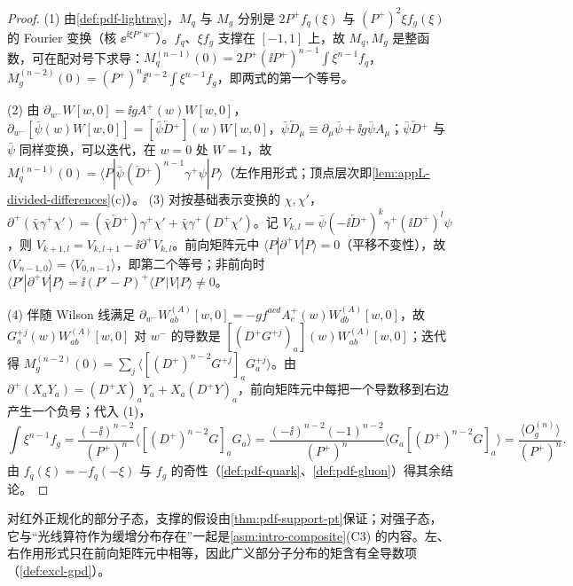 \begin{proof}
(1) 由\cref{def:pdf-lightray}，$M_q$ 与 $M_g$ 分别是 $2P^+f_q(\xi)$ 与 $(P^+)^2\xi f_g(\xi)$ 的 Fourier 变换（核 $\ee^{\ii\xi P^+w^-}$）。$f_q$、$\xi f_g$ 支撑在 $[-1,1]$ 上，故 $M_q,M_g$ 是整函数\cite[定理~7.3.1]{Hormander2003}，可在配对号下求导：$M_q^{(n-1)}(0)=2P^+(\ii P^+)^{n-1}\int\xi^{n-1}f_q$，$M_g^{(n-2)}(0)=(P^+)^n\ii^{n-2}\int\xi^{n-1}f_g$，即两式的第一个等号。

(2) 由 $\partial_{w^-}W[w,0]=\ii gA^+(w)W[w,0]$，$\partial_{w^-}[\bar\psi(w)W[w,0]]=[\bar\psi\overleftarrow{D}{}^+](w)W[w,0]$，$\bar\psi\overleftarrow{D}_\mu\equiv\partial_\mu\bar\psi+\ii g\bar\psi A_\mu$；$\bar\psi\overleftarrow{D}{}^+$ 与 $\bar\psi$ 同样变换，可以迭代，在 $w=0$ 处 $W=1$，故 $M_q^{(n-1)}(0)=\langle P|\bar\psi(\overleftarrow{D}{}^+)^{n-1}\gamma^+\psi|P\rangle$（左作用形式；顶点层次即\cref{lem:appL-divided-differences}(c)）。
(3) 对按基础表示变换的 $\chi,\chi'$，$\partial^+(\bar\chi\gamma^+\chi')=(\bar\chi\overleftarrow{D}{}^+)\gamma^+\chi'+\bar\chi\gamma^+(D^+\chi')$。记 $V_{k,l}=\bar\psi(-\ii\overleftarrow{D}{}^+)^k\gamma^+(\ii D^+)^l\psi$，则 $V_{k+1,l}=V_{k,l+1}-\ii\partial^+V_{k,l}$。前向矩阵元中 $\langle P|\partial^+V|P\rangle=0$（平移不变性），故 $\langle V_{n-1,0}\rangle=\langle V_{0,n-1}\rangle$，即第二个等号；非前向时 $\langle P'|\partial^+V|P\rangle=\ii(P'-P)^+\langle P'|V|P\rangle\ne0$。

(4) 伴随 Wilson 线满足 $\partial_{w^-}W^{(A)}_{ab}[w,0]=-gf^{acd}A^+_c(w)W^{(A)}_{db}[w,0]$，故 $G^{+j}_a(w)W^{(A)}_{ab}[w,0]$ 对 $w^-$ 的导数是 $[(D^+G^{+j})_a](w)W^{(A)}_{ab}[w,0]$；迭代得 $M_g^{(n-2)}(0)=\sum_j\langle[(D^+)^{n-2}G^{+j}]_aG^{+j}_a\rangle$。由 $\partial^+(X_aY_a)=(D^+X)_aY_a+X_a(D^+Y)_a$，前向矩阵元中每把一个导数移到右边产生一个负号；代入 (1)，
\[
\int\xi^{n-1}f_g=\frac{(-\ii)^{n-2}}{(P^+)^n}\big\langle[(D^+)^{n-2}G]_aG_a\big\rangle=\frac{(-\ii)^{n-2}(-1)^{n-2}}{(P^+)^n}\big\langle G_a[(D^+)^{n-2}G]_a\big\rangle=\frac{\langle O^{(n)}_g\rangle}{(P^+)^n}.
\]由 $f_{\bar q}(\xi)=-f_q(-\xi)$ 与 $f_g$ 的奇性（\cref{def:pdf-quark}、\cref{def:pdf-gluon}）得其余结论。
\end{proof}

对红外正规化的部分子态，支撑的假设由\cref{thm:pdf-support-pt}保证；对强子态，它与“光线算符作为缓增分布存在”一起是\cref{asm:intro-composite}(C3) 的内容。左、右作用形式只在前向矩阵元中相等，因此广义部分子分布的矩含有全导数项（\cref{def:excl-gpd}）。

